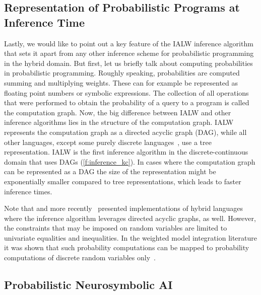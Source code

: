 \subsection{Representation of Probabilistic Programs at Inference Time}

Lastly, we would like to point out a key feature of the IALW inference algorithm that sets it apart from any other inference scheme for probabilistic programming in the hybrid domain. But first, let us briefly talk about computing probabilities in probabilistic programming. Roughly speaking, probabilities are computed summing and multiplying weights. These can for example be represented as floating point numbers or symbolic expressions. The collection of all operations that were performed to obtain the probability of a query to a program is called the computation graph. Now, the big difference between IALW and other inference algorithms lies in the structure of the computation graph. IALW represents the computation graph as a directed acyclic graph (DAG), while all other languages, except some purely discrete languages~\citep{fierens2015inference,holtzen2020dice}, use a tree representation. IALW is the first inference algorithm in the discrete-continuous domain that uses DAGs (\ref{f:inference_kc}). In cases where the computation graph can be represented as a DAG the size of the representation might be exponentially smaller compared to tree representations, which leads to faster inference times.

Note that \citet{gutmann2010extending} and more recently~\citet{saad2021sppl} presented implementations of hybrid languages where the inference algorithm leverages directed acyclic graphs, as well. However, the constraints that may be imposed on random variables are limited to univariate equalities and inequalities. In the weighted model integration literature it was shown that such probability computations can be mapped to probability computations of discrete random variables only~\citep{zeng2019efficient}.


\subsection{Probabilistic Neurosymbolic AI}


